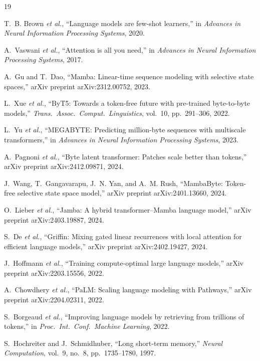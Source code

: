 \documentclass[journal]{IEEEtran}
\begin{document}
\begin{thebibliography}{19}

T.~B. Brown \emph{et al.},
``Language models are few-shot learners,''
in \emph{Advances in Neural Information Processing Systems}, 2020.

A.~Vaswani \emph{et al.},
``Attention is all you need,''
in \emph{Advances in Neural Information Processing Systems}, 2017.

A.~Gu and T.~Dao,
``Mamba: Linear-time sequence modeling with selective state spaces,''
arXiv preprint arXiv:2312.00752, 2023.

L.~Xue \emph{et al.},
``ByT5: Towards a token-free future with pre-trained byte-to-byte models,''
\emph{Trans.\ Assoc.\ Comput.\ Linguistics}, vol.~10, pp.~291--306, 2022.

L.~Yu \emph{et al.},
``MEGABYTE: Predicting million-byte sequences with multiscale transformers,''
in \emph{Advances in Neural Information Processing Systems}, 2023.

A.~Pagnoni \emph{et al.},
``Byte latent transformer: Patches scale better than tokens,''
arXiv preprint arXiv:2412.09871, 2024.

J.~Wang, T.~Gangavarapu, J.~N. Yan, and A.~M. Rush,
``MambaByte: Token-free selective state space model,''
arXiv preprint arXiv:2401.13660, 2024.

O.~Lieber \emph{et al.},
``Jamba: A hybrid transformer--Mamba language model,''
arXiv preprint arXiv:2403.19887, 2024.

S.~De \emph{et al.},
``Griffin: Mixing gated linear recurrences with local attention for efficient language models,''
arXiv preprint arXiv:2402.19427, 2024.

J.~Hoffmann \emph{et al.},
``Training compute-optimal large language models,''
arXiv preprint arXiv:2203.15556, 2022.

A.~Chowdhery \emph{et al.},
``PaLM: Scaling language modeling with Pathways,''
arXiv preprint arXiv:2204.02311, 2022.

S.~Borgeaud \emph{et al.},
``Improving language models by retrieving from trillions of tokens,''
in \emph{Proc.\ Int.\ Conf.\ Machine Learning}, 2022.

S.~Hochreiter and J.~Schmidhuber,
``Long short-term memory,''
\emph{Neural Computation}, vol.~9, no.~8, pp.~1735--1780, 1997.


\end{thebibliography}
\end{document}
